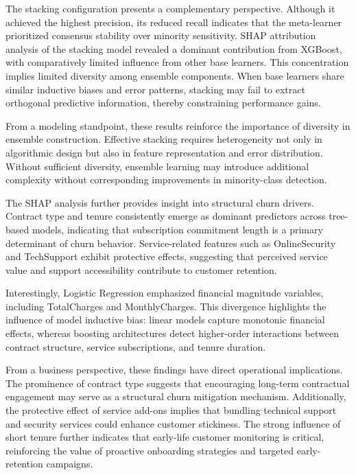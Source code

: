 \documentclass[a4paper,twoside]{article}
\begin{document}
The stacking configuration presents a complementary perspective. Although it achieved the highest precision, its reduced recall indicates that the meta-learner prioritized consensus stability over minority sensitivity. SHAP attribution analysis of the stacking model revealed a dominant contribution from XGBoost, with comparatively limited influence from other base learners. This concentration implies limited diversity among ensemble components. When base learners share similar inductive biases and error patterns, stacking may fail to extract orthogonal predictive information, thereby constraining performance gains.

From a modeling standpoint, these results reinforce the importance of diversity in ensemble construction. Effective stacking requires heterogeneity not only in algorithmic design but also in feature representation and error distribution. Without sufficient diversity, ensemble learning may introduce additional complexity without corresponding improvements in minority-class detection.

The SHAP analysis further provides insight into structural churn drivers. Contract type and tenure consistently emerge as dominant predictors across tree-based models, indicating that subscription commitment length is a primary determinant of churn behavior. Service-related features such as OnlineSecurity and TechSupport exhibit protective effects, suggesting that perceived service value and support accessibility contribute to customer retention.

Interestingly, Logistic Regression emphasized financial magnitude variables, including TotalCharges and MonthlyCharges. This divergence highlights the influence of model inductive bias: linear models capture monotonic financial effects, whereas boosting architectures detect higher-order interactions between contract structure, service subscriptions, and tenure duration.

From a business perspective, these findings have direct operational implications. The prominence of contract type suggests that encouraging long-term contractual engagement may serve as a structural churn mitigation mechanism. Additionally, the protective effect of service add-ons implies that bundling technical support and security services could enhance customer stickiness. The strong influence of short tenure further indicates that early-life customer monitoring is critical, reinforcing the value of proactive onboarding strategies and targeted early-retention campaigns.
\end{document}
